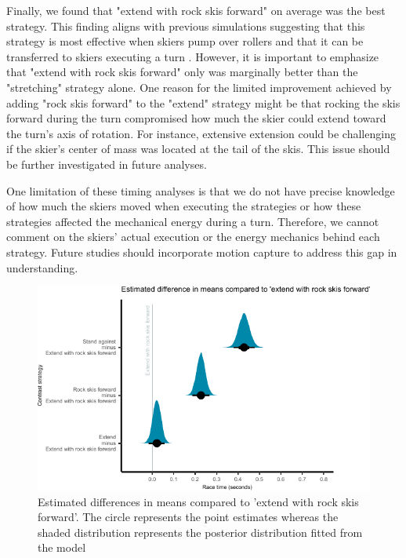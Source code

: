 \documentclass{report}
\begin{document}
Finally, we found that "extend with rock skis forward" on average was the best strategy. This finding aligns with previous simulations suggesting that this strategy is most effective when skiers pump over rollers \cite{mote_accelerations_1983} and that it can be transferred to skiers executing a turn \cite{reid_kinematic_2010}. However, it is important to emphasize that "extend with rock skis forward" only was marginally better than the "stretching" strategy alone. One reason for the limited improvement achieved by adding "rock skis forward" to the "extend" strategy might be that rocking the skis forward during the turn compromised how much the skier could extend toward the turn's axis of rotation. For instance, extensive extension could be challenging if the skier's center of mass was located at the tail of the skis. This issue should be further investigated in future analyses.

One limitation of these timing analyses is that we do not have precise knowledge of how much the skiers moved when executing the strategies or how these strategies affected the mechanical energy during a turn. Therefore, we cannot comment on the skiers' actual execution or the energy mechanics behind each strategy. Future studies should incorporate motion capture to address this gap in understanding.



\begin{figure}[H]
\centering
\includegraphics{figure_results_Q1_strategies.pdf}
\caption{Estimated differences in means compared to 'extend with rock skis forward'. The circle represents the point estimates whereas the shaded distribution represents the posterior distribution fitted from the model}
\label{fig:q1_strategieseffect}
\end{figure}
\end{document}
